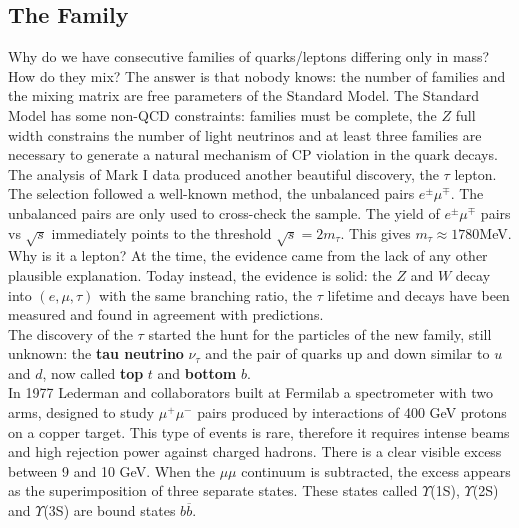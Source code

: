 \documentclass[10.75pt,a4paper,openright,bottom=2cm]{article}
\begin{document}
\subsection{The  Family}
Why do we have consecutive families of quarks/leptons differing only in mass? How do they mix? The answer is that nobody knows: the number of families and the mixing matrix are free parameters of the Standard Model. The Standard Model has some non-QCD constraints: families must be complete, the $Z$ full width constrains the number of light neutrinos and at least three families are necessary to generate a natural mechanism of CP violation in the quark decays.\\
The analysis of Mark I data produced another beautiful discovery, the $\tau$ lepton. The selection followed a well-known method, the unbalanced pairs $e^\pm\mu^\mp$. The unbalanced pairs are only used to cross-check the sample. The yield of $e^\pm\mu^\mp$ pairs vs $\sqrt{s}$ immediately points to the threshold $\sqrt{s}=2m_\tau$. This gives $m_\tau\approx1780$\;MeV. Why is it a lepton? At the time, the evidence came from the lack of any other plausible explanation. Today instead, the evidence is solid: the $Z$ and $W$ decay into $(e,\mu,\tau)$ with the same branching ratio, the $\tau$ lifetime and decays have been measured and found in agreement with predictions.\\
The discovery of the $\tau$ started the hunt for the particles of the new family, still unknown: the \textbf{tau neutrino} $\nu_\tau$ and the pair of quarks up and down similar to $u$ and $d$, now called \textbf{top} $t$ and \textbf{bottom} $b$.\\
In 1977 Lederman and collaborators built at Fermilab a spectrometer with two arms, designed to study $\mu^+\mu^-$ pairs produced by interactions of 400 GeV protons on a copper target. This type of events is rare, therefore it requires intense beams and high rejection power against charged hadrons. There is a clear visible excess between 9 and 10 GeV. When the $\mu\mu$ continuum is subtracted, the excess appears as the superimposition of three separate states. These states called $\Upsilon$(1S), $\Upsilon$(2S) and $\Upsilon$(3S) are bound states $b\overline{b}$.\\
\end{document}
